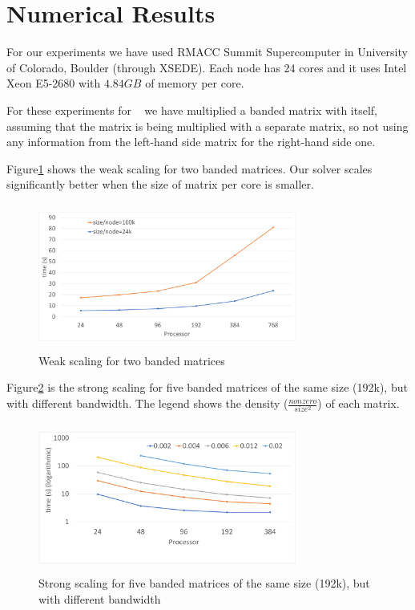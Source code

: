 \section{Numerical Results}
\label{sec:results}

For our experiments we have used RMACC Summit Supercomputer in University of Colorado, Boulder (through XSEDE). Each node has 24 cores and it uses Intel Xeon E5-2680 with $4.84GB$ of memory per core.

For these experiments for \mm~ we have multiplied a banded matrix with itself, assuming that the matrix is being multiplied with a separate matrix, so not using any information from the left-hand side matrix for the right-hand side one.

Figure\ref{fig:weak1} shows the weak scaling for two banded matrices. Our solver scales significantly better when the size of matrix per core is smaller.

\begin{figure}[tbh]
 \centering
 \includegraphics[width=8.5cm,height=4.8cm]{./figures/weak1.pdf}
 \caption{Weak scaling for two banded matrices}
 \label{fig:weak1}
\end{figure}

Figure\ref{fig:strong1} is the strong scaling for five banded matrices of the same size (192k), but with different bandwidth. The legend shows the density ($\frac{nonzero}{size^2}$) of each matrix.

\begin{figure}[tbh]
 \centering
 \includegraphics[width=8.5cm,height=4.9cm]{./figures/strong1.pdf}
 \caption{Strong scaling for five banded matrices of the same size (192k), but with different bandwidth}
 \label{fig:strong1}
\end{figure}

